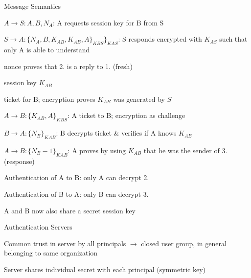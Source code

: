 \documentclass[a4paper]{article}
\begin{document}
\begin{multicols}{3}

    Message Semantics
    \begin{enumerate*}
        \item $A\rightarrow S:A,B,N_A$: A requests session key for B from S
        \item $S\rightarrow A:\{N_A,B,K_{AB},K_{AB},A\}_{KBS}\}_{KAS}$: S responds encrypted with $K_{AS}$ such that only A is able to understand
        \begin{itemize*}
            \item nonce proves that 2. is a reply to 1. (fresh)
            \item session key $K_{AB}$
            \item ticket for B; encryption proves $K_{AB}$ was generated by $S$
        \end{itemize*}
        \item $A\rightarrow B:\{K_{AB},A\}_{KBS}$: A ticket to B; encryption as challenge
        \item $B\rightarrow A:\{N_B\}_{KAB}$: B decrypts ticket \& verifies if A knows $K_{AB}$
        \item $A\rightarrow B:\{N_B-1\}_{KAB}$: A proves by using $K_{AB}$ that he was the sender of 3. (response)
        \begin{itemize*}
            \item Authentication of A to B: only A can decrypt 2.
            \item Authentication of B to A: only B can decrypt 3.
            \item A and B now also share a secret session key
        \end{itemize*}
    \end{enumerate*}

    Authentication Servers
    \begin{itemize*}
        \item Common trust in server by all principals $\rightarrow$ closed user group, in general belonging to same organization
        \item Server shares individual secret with each principal (symmetric key)
    \end{itemize*}


\end{multicols}
\end{document}
